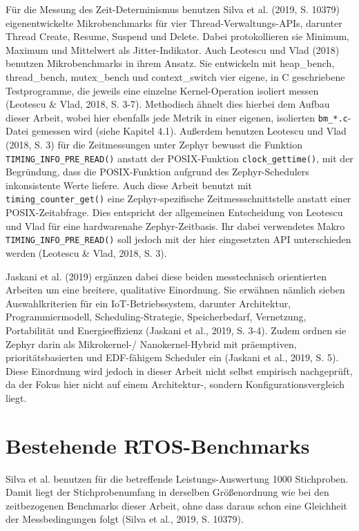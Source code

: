 F{\"u}r die Messung des Zeit-Determinismus benutzen Silva et al. (2019, S. 10379) eigenentwickelte Mikrobenchmarks f{\"u}r vier Thread-Verwaltungs-APIs, darunter \glqq{}Thread Create\grqq{}, \glqq{}Resume\grqq{}, \glqq{}Suspend\grqq{} und \glqq{}Delete\grqq{}. Dabei protokollieren sie Minimum, Maximum und Mittelwert als Jitter-Indikator. Auch Leotescu und Vlad (2018) benutzen Mikrobenchmarks in ihrem Ansatz. Sie entwickeln mit \glqq{}heap\_bench\grqq{}, \glqq{}thread\_bench\grqq{}, \glqq{}mutex\_bench\grqq{} und \glqq{}context\_switch\grqq{} vier eigene, in C geschriebene Testprogramme, die jeweils eine einzelne Kernel-Operation isoliert messen (Leotescu \& Vlad, 2018, S. 3-7). Methodisch {\"a}hnelt dies hierbei dem Aufbau dieser Arbeit, wobei hier ebenfalls jede Metrik in einer eigenen, isolierten \lstinline[style=codeinline]|bm_*.c|-Datei gemessen wird (siehe Kapitel 4.1). Au{\ss}erdem benutzen Leotescu und Vlad (2018, S. 3) f{\"u}r die Zeitmessungen unter Zephyr bewusst die Funktion \lstinline[style=codeinline]|TIMING_INFO_PRE_READ()| anstatt der POSIX-Funktion \lstinline[style=codeinline]|clock_gettime()|, mit der Begr{\"u}ndung, dass die POSIX-Funktion aufgrund des Zephyr-Schedulers inkonsistente Werte liefere. Auch diese Arbeit benutzt mit \lstinline[style=codeinline]|timing_counter_get()| eine Zephyr-spezifische Zeitmessschnittstelle anstatt einer POSIX-Zeitabfrage. Dies entspricht der allgemeinen Entscheidung von Leotescu und Vlad f{\"u}r eine hardwarenahe Zephyr-Zeitbasis. Ihr dabei verwendetes Makro \lstinline[style=codeinline]|TIMING_INFO_PRE_READ()| soll jedoch mit der hier eingesetzten API unterschieden werden (Leotescu \& Vlad, 2018, S. 3).

Jaskani et al. (2019) erg{\"a}nzen dabei diese beiden messtechnisch orientierten Arbeiten um eine breitere, qualitative Einordnung. Sie erw{\"a}hnen n{\"a}mlich sieben Auswahlkriterien f{\"u}r ein IoT-Betriebssystem, darunter Architektur, Programmiermodell, Scheduling-Strategie, Speicherbedarf, Vernetzung, Portabilit{\"a}t und Energieeffizienz (Jaskani et al., 2019, S. 3-4). Zudem ordnen sie Zephyr darin als Mikrokernel-/ Nanokernel-Hybrid mit pr{\"a}emptiven, priorit{\"a}tsbasierten und EDF-f{\"a}higem Scheduler ein (Jaskani et al., 2019, S. 5). Diese Einordnung wird jedoch in dieser Arbeit nicht selbst empirisch nachgepr{\"u}ft, da der Fokus hier nicht auf einem Architektur-, sondern Konfigurationsvergleich liegt.

\section{Bestehende RTOS-Benchmarks}
Silva et al. benutzen f{\"u}r die betreffende Leistungs-Auswertung 1000 Stichproben. Damit liegt der Stichprobenumfang in derselben Gr{\"o}{\ss}enordnung wie bei den zeitbezogenen Benchmarks dieser Arbeit, ohne dass daraus schon eine Gleichheit der Messbedingungen folgt (Silva et al., 2019, S. 10379).

